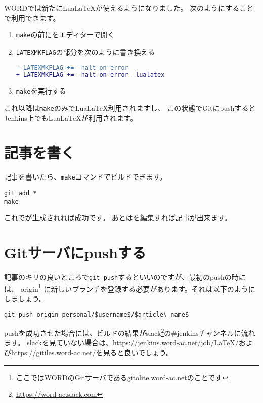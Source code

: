 \documentclass[../../main]{subfiles}
\begin{document}
WORDでは新たにLua\LaTeX が使えるようになりました。
次のようにすることで利用できます。

\begin{enumerate}
  \item \lstinline|make|の前にをエディターで開く
  \item \lstinline|LATEXMKFLAG|の部分を次のように書き換える
\begin{lstlisting}[language=diff]
- LATEXMKFLAG += -halt-on-error
+ LATEXMKFLAG += -halt-on-error -lualatex
\end{lstlisting}

  \item \lstinline|make|を実行する
\end{enumerate}

これ以降は\lstinline|make|のみでLua\LaTeX 利用されますし、
この状態でGitにpushするとJenkins上でもLua\LaTeX が利用されます。

\section{記事を書く}

記事を書いたら、\lstinline|make|コマンドでビルドできます。

\begin{lstlisting}
git add *
make
\end{lstlisting}

これでが生成されれば成功です。
あとはを編集すれば記事が出来ます。

\section{Gitサーバにpushする}

記事のキリの良いところで\lstinline|git push|するといいのですが、最初のpushの時には、
origin\footnote{ここではWORDのGitサーバである\url{gitolite.word-ac.net}のことです}%
に新しいブランチを登録する必要があります。それは以下のようにしましょう。

\begin{lstlisting}[mathescape]
git push origin personal/$username$/$article\_name$
\end{lstlisting}

pushを成功させた場合には、ビルドの結果がslack\footnote{\url{https://word-ac.slack.com}}の\#jenkinsチャンネルに流れます。
slackを見ていない場合は、\url{https://jenkins.word-ac.net/job/LaTeX/}および\url{https://gitiles.word-ac.net/}を見ると良いでしょう。
\end{document}
